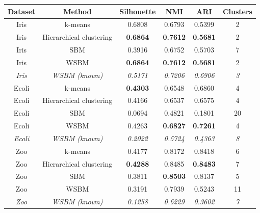 \documentclass[conference]{IEEEtran}
\begin{document}
\begin{table}[ht]
  \centering
  \begin{tabular}{c | c | c c c | c}
    Dataset & Method & Silhouette & NMI & ARI & Clusters \\ \hline
    Iris & k-means & 0.6808 & 0.6793 & 0.5399 & 2 \\
    Iris & Hierarchical clustering & \textbf{0.6864} & \textbf{0.7612} & \textbf{0.5681} & 2 \\
    Iris & SBM & 0.3916 & 0.6752 & 0.5703 & 7 \\
    Iris & WSBM & \textbf{0.6864} & \textbf{0.7612} & \textbf{0.5681} & 2 \\
    \textit{Iris} & \textit{WSBM (known)} & \textit{0.5171} & \textit{0.7206} & \textit{0.6906} & \textit{3} \\
    \hline
    Ecoli & k-means & \textbf{0.4303} & 0.6548 & 0.6860 & 4 \\
    Ecoli & Hierarchical clustering & 0.4166 & 0.6537 & 0.6575 & 4 \\
    Ecoli & SBM & 0.0694 & 0.4821 & 0.1801 & 20 \\
    Ecoli & WSBM & 0.4263 & \textbf{0.6827} & \textbf{0.7261} & 4 \\
    \textit{Ecoli} & \textit{WSBM (known)} & \textit{0.2022} & \textit{0.5724} & \textit{0.4363} & \textit{8} \\
    \hline
    Zoo & k-means & 0.4177 & 0.8172 & 0.8418 & 6 \\
    Zoo & Hierarchical clustering & \textbf{0.4288} & 0.8485 & \textbf{0.8483} & 7 \\
    Zoo & SBM & 0.3811 & \textbf{0.8503} & 0.8137 & 5 \\
    Zoo & WSBM & 0.3191 & 0.7939 & 0.5243 & 11 \\
    \textit{Zoo} & \textit{WSBM (known)} & \textit{0.1258} & \textit{0.6229} & \textit{0.3602} & \textit{7} \\
    \hline

\end{tabular}
\end{table}
\end{document}
